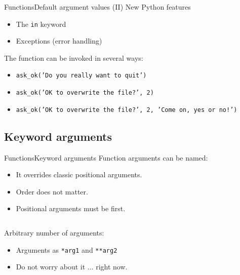 \documentclass[10pt,compress]{beamer} %
\begin{document}
\begin{frame}{Functions}{Default argument values (II)}
	New Python features
		\begin{itemize}
		\item The \texttt{in} keyword
		\item Exceptions (error handling)
		\end{itemize}

	The function can be invoked in several ways:
		\begin{itemize}
		\item \texttt{ask\_ok('Do you really want to quit')}
		\item \texttt{ask\_ok('OK to overwrite the file?', 2)}
		\item \texttt{ask\_ok('OK to overwrite the file?', 2, 'Come on, yes or no!')}
		\end{itemize}
\end{frame}

\subsection{Keyword arguments}
\begin{frame}{Functions}{Keyword arguments}
	Function arguments can be named:
		\begin{itemize}
		\item It overrides classic positional arguments.
		\item Order does not matter.
		\item Positional arguments must be first.
		\end{itemize}
		\vspace{-0.2cm}
    \begin{columns}
		\begin{block}{}
		\vspace{-0.2cm}
		
		\vspace{-0.2cm}
		\end{block}

	\column{0.6\textwidth}
		\begin{block}{}
		\vspace{-0.2cm}
		
		\vspace{-0.2cm}
		\end{block}
	\end{columns}
	\bigskip
	Arbitrary number of arguments:
		\begin{itemize}
			\item Arguments as \texttt{*arg1} and \texttt{**arg2}
			\item Do not worry about it ... right now.
		\end{itemize}
\end{frame}
\end{document}
